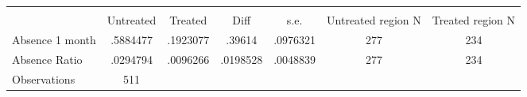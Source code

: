 {
\def\sym#1{\ifmmode^{#1}\else\(^{#1}\)\fi}
\begin{tabular}{l*{1}{cccccc}}
\hline\hline
                    &\multicolumn{6}{c}{}                                                         \\
                    &   Untreated&     Treated&        Diff&        s.e.&Untreated region N&Treated region N\\
\hline
Absence 1 month     &    .5884477&    .1923077&      .39614&    .0976321&         277&         234\\
Absence Ratio       &    .0294794&    .0096266&    .0198528&    .0048839&         277&         234\\
\hline
Observations        &         511&            &            &            &            &            \\
\hline\hline
\end{tabular}
}
